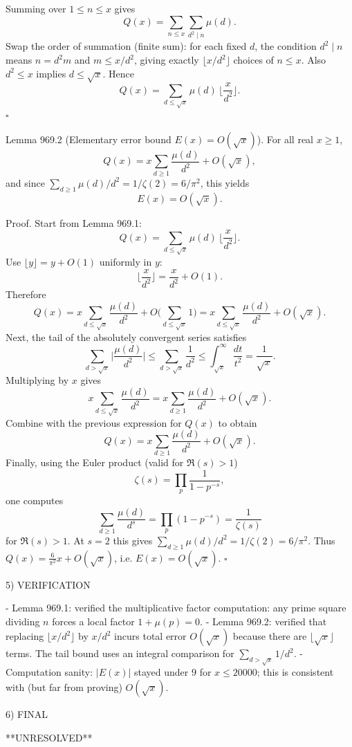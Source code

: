 Summing over $1\le n\le x$ gives
\[
Q(x)=\sum_{n\le x} \sum_{d^2\mid n} \mu(d).
\]
Swap the order of summation (finite sum): for each fixed $d$, the condition $d^2\mid n$ means $n=d^2 m$ and $m\le x/d^2$, giving exactly $\lfloor x/d^2\rfloor$ choices of $n\le x$. Also $d^2\le x$ implies $d\le \sqrt x$. Hence
\[
Q(x)=\sum_{d\le \sqrt x} \mu(d)\,\Big\lfloor \frac{x}{d^2}\Big\rfloor.
\]
$\square$

Lemma 969.2 (Elementary error bound $E(x)=O(\sqrt x)$).
For all real $x\ge 1$,
\[
Q(x)=x\sum_{d\ge 1}\frac{\mu(d)}{d^2} + O(\sqrt x),
\]
and since $\sum_{d\ge 1}\mu(d)/d^2 = 1/\zeta(2)=6/\pi^2$, this yields
\[
E(x)=O(\sqrt x).
\]

Proof.
Start from Lemma 969.1:
\[
Q(x)=\sum_{d\le \sqrt x} \mu(d)\,\Big\lfloor\frac{x}{d^2}\Big\rfloor.
\]
Use $\lfloor y\rfloor = y + O(1)$ uniformly in $y$:
\[
\Big\lfloor\frac{x}{d^2}\Big\rfloor = \frac{x}{d^2} + O(1).
\]
Therefore
\[
Q(x)= x\sum_{d\le \sqrt x}\frac{\mu(d)}{d^2} + O\Big(\sum_{d\le \sqrt x} 1\Big)
= x\sum_{d\le \sqrt x}\frac{\mu(d)}{d^2} + O(\sqrt x).
\]
Next, the tail of the absolutely convergent series satisfies
\[
\sum_{d>\sqrt x}\Big|\frac{\mu(d)}{d^2}\Big| \le \sum_{d>\sqrt x} \frac{1}{d^2} \le \int_{\sqrt x}^{\infty} \frac{dt}{t^2} = \frac{1}{\sqrt x}.
\]
Multiplying by $x$ gives
\[
 x\sum_{d\le \sqrt x}\frac{\mu(d)}{d^2} = x\sum_{d\ge 1}\frac{\mu(d)}{d^2} + O(\sqrt x).
\]
Combine with the previous expression for $Q(x)$ to obtain
\[
Q(x)=x\sum_{d\ge 1}\frac{\mu(d)}{d^2} + O(\sqrt x).
\]
Finally, using the Euler product (valid for $\Re(s)>1$)
\[
\zeta(s)=\prod_p \frac{1}{1-p^{-s}},
\]
one computes
\[
\sum_{d\ge 1}\frac{\mu(d)}{d^s} = \prod_p (1-p^{-s}) = \frac{1}{\zeta(s)}
\]
for $\Re(s)>1$.
At $s=2$ this gives $\sum_{d\ge 1} \mu(d)/d^2 = 1/\zeta(2)=6/\pi^2$.
Thus $Q(x)=\frac{6}{\pi^2}x+O(\sqrt x)$, i.e. $E(x)=O(\sqrt x)$. $\square$

5) VERIFICATION

- Lemma 969.1: verified the multiplicative factor computation: any prime square dividing $n$ forces a local factor $1+\mu(p)=0$.
- Lemma 969.2: verified that replacing $\lfloor x/d^2\rfloor$ by $x/d^2$ incurs total error $O(\sqrt x)$ because there are $\lfloor\sqrt x\rfloor$ terms.
  The tail bound uses an integral comparison for $\sum_{d>\sqrt x}1/d^2$.
- Computation sanity: $|E(x)|$ stayed under $9$ for $x\le 20000$; this is consistent with (but far from proving) $O(\sqrt x)$.

6) FINAL

**UNRESOLVED**

